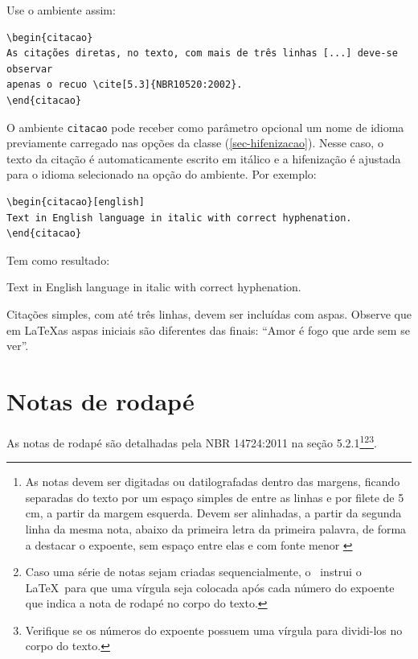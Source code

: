 Use o ambiente assim:

\begin{verbatim}
\begin{citacao}
As citações diretas, no texto, com mais de três linhas [...] deve-se observar
apenas o recuo \cite[5.3]{NBR10520:2002}.
\end{citacao}
\end{verbatim}

O ambiente \texttt{citacao} pode receber como parâmetro opcional um nome de
idioma previamente carregado nas opções da classe (\autoref{sec-hifenizacao}). Nesse
caso, o texto da citação é automaticamente escrito em itálico e a hifenização é
ajustada para o idioma selecionado na opção do ambiente. Por exemplo:

\begin{verbatim}
\begin{citacao}[english]
Text in English language in italic with correct hyphenation.
\end{citacao}
\end{verbatim}

Tem como resultado:

\begin{citacao}[english]
Text in English language in italic with correct hyphenation.
\end{citacao}

Citações simples, com até três linhas, devem ser
incluídas com aspas. Observe que em \LaTeX as aspas iniciais são diferentes das
finais: ``Amor é fogo que arde sem se ver''.

\section{Notas de rodapé}

As notas de rodapé são detalhadas pela NBR 14724:2011 na seção 5.2.1\footnote{As
notas devem ser digitadas ou datilografadas dentro das margens, ficando
separadas do texto por um espaço simples de entre as linhas e por filete de 5
cm, a partir da margem esquerda. Devem ser alinhadas, a partir da segunda linha
da mesma nota, abaixo da primeira letra da primeira palavra, de forma a destacar
o expoente, sem espaço entre elas e com fonte menor
\cite{NBR14724:2011}}\footnote{Caso uma série de notas sejam
criadas sequencialmente, o \abnTeX\ instrui o \LaTeX\ para que uma vírgula seja
colocada após cada número do expoente que indica a nota de rodapé no corpo do
texto.}\footnote{Verifique se os números do expoente possuem uma vírgula para
dividi-los no corpo do texto.}. 


